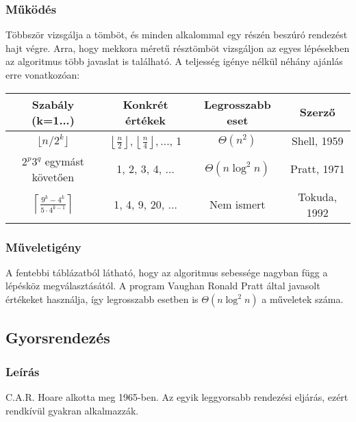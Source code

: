 \documentclass{elteikthesis}
\begin{document}
\subsubsection{Működés}
Többször vizsgálja a tömböt, és minden alkalommal egy részén beszúró rendezést hajt végre. Arra, hogy mekkora méretű résztömböt vizsgáljon az egyes lépésekben az algoritmus több javaslat is található. A teljesség igénye nélkül néhány ajánlás\cite{ShellWiki} erre vonatkozóan:\par
\begin{table}[h]
	\def\arraystretch{2}
	\centering
	\begin{tabular}{|c|c|c|c|}
		\hline
		\textbf{Szabály (k=1...)} & \textbf{Konkrét értékek}  & \textbf{Legrosszabb eset} & \textbf{Szerző}         \\ \hline
		$\lfloor n / 2^k \rfloor$&      $\left\lfloor\frac{n}{2}\right\rfloor,
		\left\lfloor\frac{n}{4}\right\rfloor, \ldots$, 1            &              $\Theta(n^2)$                      & Shell, 1959     \\ \hline
		$2^p 3^q$ egymást követően & 1, 2, 3, 4, $\ldots$  &               $\Theta(n \log^2 n)$                     & Pratt, 1971     \\ \hline
		$\left\lceil \frac{9^k-4^k}{5\cdot4^{k-1}} \right\rceil$& 1, 4, 9, 20, $\ldots$ &             Nem ismert                       & Tokuda, 1992	\\ \hline
	\end{tabular}
\end{table}
\subsubsection{Műveletigény}
 A fentebbi táblázatból látható, hogy az algoritmus sebessége nagyban függ a lépésköz megválasztásától. A program Vaughan Ronald Pratt által javasolt értékeket\cite{Pratt} használja, így legrosszabb esetben is $\Theta(n \log^2 n)$ a műveletek száma.

\subsection{Gyorsrendezés}
\subsubsection{Leírás}
C.A.R. Hoare\cite{Horae} alkotta meg 1965-ben. Az egyik leggyorsabb rendezési eljárás, ezért rendkívül gyakran alkalmazzák.
\end{document}
